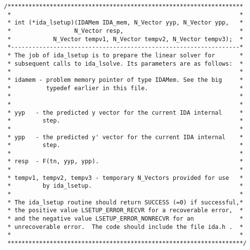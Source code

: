 \begin{verbatim}
/*******************************************************************
 *                                                                 *
 * int (*ida_lsetup)(IDAMem IDA_mem, N_Vector yyp, N_Vector ypp,   *
 *                  N_Vector resp,                                 *
 *            N_Vector tempv1, N_Vector tempv2, N_Vector tempv3);  *
 *-----------------------------------------------------------------*
 * The job of ida_lsetup is to prepare the linear solver for       *
 * subsequent calls to ida_lsolve. Its parameters are as follows:  *
 *                                                                 *
 * idamem - problem memory pointer of type IDAMem. See the big     *
 *          typedef earlier in this file.                          *
 *                                                                 *
 *                                                                 *
 * yyp   - the predicted y vector for the current IDA internal     *
 *         step.                                                   *
 *                                                                 *
 * ypp   - the predicted y' vector for the current IDA internal    *
 *         step.                                                   *
 *                                                                 *
 * resp  - F(tn, yyp, ypp).                                        *
 *                                                                 *
 * tempv1, tempv2, tempv3 - temporary N_Vectors provided for use   *
 *         by ida_lsetup.                                          *
 *                                                                 *
 * The ida_lsetup routine should return SUCCESS (=0) if successful,*
 * the positive value LSETUP_ERROR_RECVR for a recoverable error,  *
 * and the negative value LSETUP_ERROR_NONRECVR for an             *
 * unrecoverable error.  The code should include the file ida.h .  *
 *                                                                 *
 *******************************************************************/


\end{verbatim}
